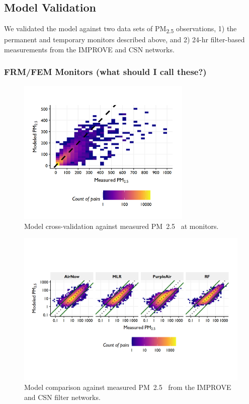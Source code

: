 \documentclass[gmd, manuscript]{copernicus}
\begin{document}
\subsection{Model Validation}

We validated the model against two data sets of PM\textsubscript{2.5}
observations, 1) the permanent and temporary monitors described above,
and 2) 24-hr filter-based measurements from the IMPROVE and CSN
networks.

\subsubsection{FRM/FEM Monitors (what should I call these?)}

\begin{figure}
\includegraphics[width=8.3cm]{./Figures/MultiEventValidationGMD} \caption{Model cross-validation against measured PM~2.5~ at monitors.}\label{fig:unnamed-chunk-1}
\end{figure}

\begin{figure}
\includegraphics[width=12cm]{./Figures/MethodComparisonGMD} \caption{Model comparison against measured PM~2.5~ from the IMPROVE and CSN filter networks.}\label{fig:unnamed-chunk-2}
\end{figure}
\end{document}
